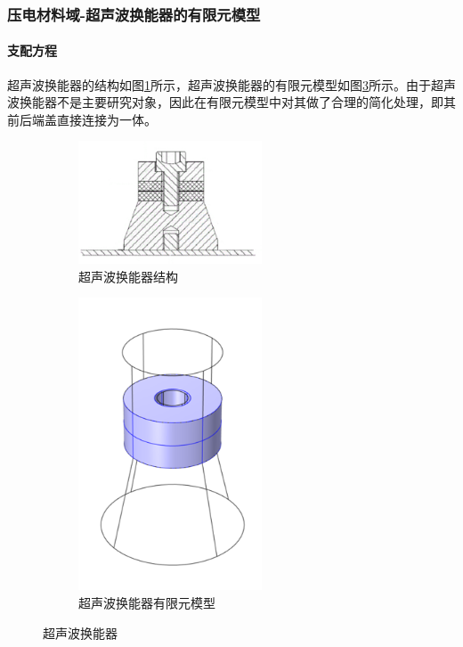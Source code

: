 \documentclass[fontset=windows,12pt,a4paper]{ctexart}
\begin{document}
\subsubsection{压电材料域-超声波换能器的有限元模型}

\paragraph{支配方程}

超声波换能器的结构如图\ref{pic:超声波换能器结构}所示，超声波换能器的有限元模型如图\ref{pic:超声波换能器有限元模型}所示。由于超声波换能器不是主要研究对象，因此在有限元模型中对其做了合理的简化处理，即其前后端盖直接连接为一体。

\begin{figure}[h]
  \centering
  \begin{subfigure}{0.4\textwidth}
    \centering
    \includegraphics[width=0.6\textwidth]{assets/ultrasonic_transducer_structure.png}
    \caption{超声波换能器结构}
    \label{pic:超声波换能器结构}
  \end{subfigure}
  \hfil
  \begin{subfigure}{0.4\textwidth}
    \centering
    \includegraphics[width=0.6\textwidth]{assets/ultrasonic_transducer_model.png}
    \caption{超声波换能器有限元模型}
    \label{pic:超声波换能器有限元模型}
  \end{subfigure}
  \caption{超声波换能器}
\end{figure}
\end{document}
